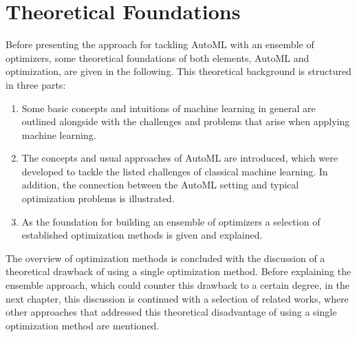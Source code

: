 %
\chapter{Theoretical Foundations}
\label{sec:theory}
Before presenting the approach for tackling AutoML with an ensemble of optimizers, some theoretical foundations of both elements, AutoML and optimization, are given in the following.
This theoretical background is structured in three parts:
\begin{enumerate}
    \item Some basic concepts and intuitions of machine learning in general are outlined alongside with the challenges and problems that arise when applying machine learning.
    \item The concepts and usual approaches of AutoML are introduced, which were developed to tackle the listed challenges of classical machine learning. In addition, the connection between the AutoML setting and typical optimization problems is illustrated.
    \item As the foundation for building an ensemble of optimizers a selection of established optimization methods is given and explained.
\end{enumerate}
The overview of optimization methods is concluded with the discussion of a theoretical drawback of using a single optimization method.
Before explaining the ensemble approach, which could counter this drawback to a certain degree, in the next chapter, this discussion is continued with a selection of related works, where other approaches that addressed this theoretical disadvantage of using a single optimization method are mentioned. 

